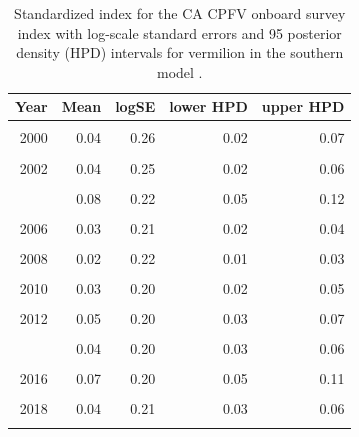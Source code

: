 \documentclass[
  english,
  a4paper,
]{article}
\begin{document}
\begin{table}

\caption{\label{tab:tab-index-cpfvonboard}Standardized index for the CA CPFV onboard survey index with log-scale standard errors and 95%
       posterior density (HPD) intervals for vermilion in the southern model .}
\centering
\begin{tabular}[t]{rrrrr}
\toprule
Year & Mean & logSE & lower HPD & upper HPD\\
\midrule
\cellcolor{gray!6}{1999} & \cellcolor{gray!6}{0.03} & \cellcolor{gray!6}{0.25} & \cellcolor{gray!6}{0.02} & \cellcolor{gray!6}{0.04}\\
2000 & 0.04 & 0.26 & 0.02 & 0.07\\
\cellcolor{gray!6}{2001} & \cellcolor{gray!6}{0.03} & \cellcolor{gray!6}{0.32} & \cellcolor{gray!6}{0.01} & \cellcolor{gray!6}{0.05}\\
2002 & 0.04 & 0.25 & 0.02 & 0.06\\
\cellcolor{gray!6}{2003} & \cellcolor{gray!6}{0.10} & \cellcolor{gray!6}{0.24} & \cellcolor{gray!6}{0.06} & \cellcolor{gray!6}{0.16}\\
\addlinespace
2004 & 0.08 & 0.22 & 0.05 & 0.12\\
\cellcolor{gray!6}{2005} & \cellcolor{gray!6}{0.04} & \cellcolor{gray!6}{0.21} & \cellcolor{gray!6}{0.03} & \cellcolor{gray!6}{0.06}\\
2006 & 0.03 & 0.21 & 0.02 & 0.04\\
\cellcolor{gray!6}{2007} & \cellcolor{gray!6}{0.04} & \cellcolor{gray!6}{0.21} & \cellcolor{gray!6}{0.02} & \cellcolor{gray!6}{0.05}\\
2008 & 0.02 & 0.22 & 0.01 & 0.03\\
\addlinespace
\cellcolor{gray!6}{2009} & \cellcolor{gray!6}{0.02} & \cellcolor{gray!6}{0.21} & \cellcolor{gray!6}{0.01} & \cellcolor{gray!6}{0.03}\\
2010 & 0.03 & 0.20 & 0.02 & 0.05\\
\cellcolor{gray!6}{2011} & \cellcolor{gray!6}{0.05} & \cellcolor{gray!6}{0.20} & \cellcolor{gray!6}{0.03} & \cellcolor{gray!6}{0.07}\\
2012 & 0.05 & 0.20 & 0.03 & 0.07\\
\cellcolor{gray!6}{2013} & \cellcolor{gray!6}{0.05} & \cellcolor{gray!6}{0.20} & \cellcolor{gray!6}{0.03} & \cellcolor{gray!6}{0.07}\\
\addlinespace
2014 & 0.04 & 0.20 & 0.03 & 0.06\\
\cellcolor{gray!6}{2015} & \cellcolor{gray!6}{0.07} & \cellcolor{gray!6}{0.20} & \cellcolor{gray!6}{0.05} & \cellcolor{gray!6}{0.11}\\
2016 & 0.07 & 0.20 & 0.05 & 0.11\\
\cellcolor{gray!6}{2017} & \cellcolor{gray!6}{0.05} & \cellcolor{gray!6}{0.21} & \cellcolor{gray!6}{0.03} & \cellcolor{gray!6}{0.07}\\
2018 & 0.04 & 0.21 & 0.03 & 0.06\\
\addlinespace
\cellcolor{gray!6}{2019} & \cellcolor{gray!6}{0.07} & \cellcolor{gray!6}{0.21} & \cellcolor{gray!6}{0.05} & \cellcolor{gray!6}{0.11}\\
\bottomrule
\end{tabular}
\end{table}
\end{document}
